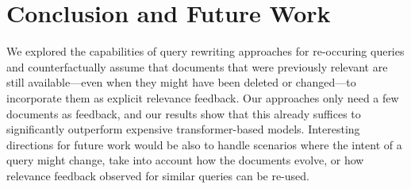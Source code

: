 \section{Conclusion and Future Work}

We explored the capabilities of query rewriting approaches for re-occuring queries and counterfactually assume that documents that were previously relevant are still available---even when they might have been deleted or changed---to incorporate them as explicit relevance feedback. Our approaches only need a few documents as feedback, and our results show that this already suffices to significantly outperform expensive transformer-based models. Interesting directions for future work would be also to handle scenarios where the intent of a query might change, take into account how the documents evolve, or how relevance feedback observed for similar queries can be re-used.
